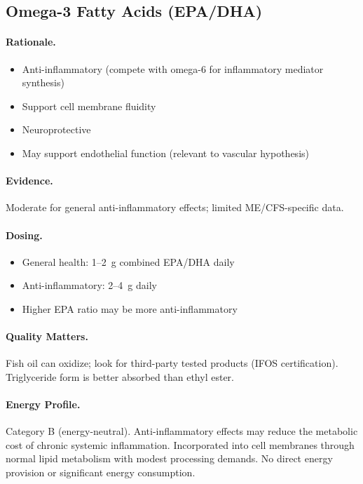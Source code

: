 \subsection{Omega-3 Fatty Acids (EPA/DHA)}

\paragraph{Rationale.}
\begin{itemize}
    \item Anti-inflammatory (compete with omega-6 for inflammatory mediator synthesis)
    \item Support cell membrane fluidity
    \item Neuroprotective
    \item May support endothelial function (relevant to vascular hypothesis)
\end{itemize}

\paragraph{Evidence.} Moderate for general anti-inflammatory effects; limited ME/CFS-specific data.

\paragraph{Dosing.}
\begin{itemize}
    \item General health: 1--2~g combined EPA/DHA daily
    \item Anti-inflammatory: 2--4~g daily
    \item Higher EPA ratio may be more anti-inflammatory
\end{itemize}

\paragraph{Quality Matters.} Fish oil can oxidize; look for third-party tested products (IFOS certification). Triglyceride form is better absorbed than ethyl ester.

\paragraph{Energy Profile.}
Category B (energy-neutral). Anti-inflammatory effects may reduce the metabolic cost of chronic systemic inflammation. Incorporated into cell membranes through normal lipid metabolism with modest processing demands. No direct energy provision or significant energy consumption.

